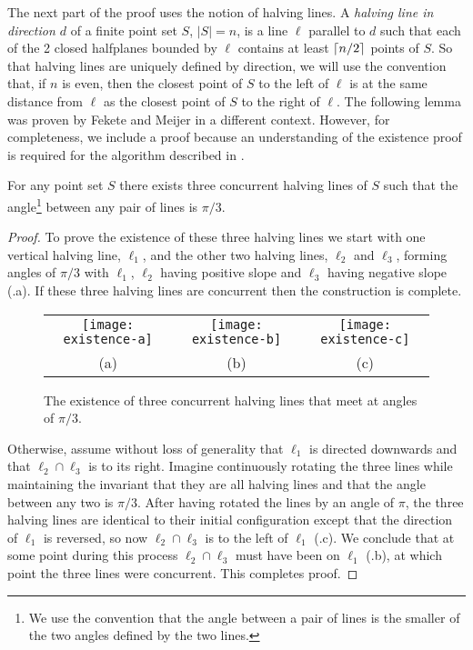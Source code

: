 \documentclass[lotsofwhite]{patmorin}
\begin{document}
The next part of the proof uses the notion of halving lines.  A
\emph{halving line in direction $d$} of a finite point set $S$,
$|S|=n$, is a line $\ell$ parallel to $d$ such that each of the 2
closed halfplanes bounded by $\ell$ contains at least
$\left\lceil n/2 \right\rceil$ points of $S$.  So that halving lines are uniquely
defined by direction, we will use the convention that, if $n$ is even,
then the closest point of $S$ to the left of $\ell$ is at the same
distance from $\ell$ as the closest point of $S$ to the right of
$\ell$.  The following lemma was proven by Fekete and Meijer
\cite[Lemma~2]{fm00} in a different context.  However, for
completeness, we include a proof because an understanding of the
existence proof is required for the algorithm described in
.

\begin{lem}
For any point set $S$ there exists three concurrent halving lines 
of $S$ such that the angle\footnote{We use the convention that
the angle between a pair of lines is the smaller of the two angles
defined by the two lines.} between any pair of lines is $\pi/3$.
\end{lem}

\begin{proof}
To prove the existence of these three halving lines we start with one
vertical halving line, $\ell_1$, and the other two halving lines,
$\ell_2$ and $\ell_3$, forming angles of $\pi/3$ with $\ell_1$,
$\ell_2$ having positive slope and $\ell_3$ having negative slope
(.a).  If these three halving lines are concurrent
then the construction is complete. 

\begin{figure}
\begin{center}\begin{tabular}{ccc}
\texttt{[image: existence-a]} &
\texttt{[image: existence-b]} &
\texttt{[image: existence-c]} \\
(a) & (b) & (c)
\end{tabular}\end{center}
\caption{The existence of three concurrent halving lines that meet at angles of
$\pi/3$.}
\end{figure}
Otherwise, assume without loss of generality that $\ell_1$ is directed downwards and that
$\ell_2\cap \ell_3$ is to its right.  Imagine continuously rotating
the three lines while maintaining the invariant that they are all
halving lines and that the angle between any two is $\pi/3$.  After
having rotated the lines by an angle of $\pi$, the three halving lines
are identical to their initial configuration except that the direction
of $\ell_1$ is reversed, so now $\ell_2\cap\ell_3$ is to the left of
$\ell_1$ (.c).  We conclude that at some point
during this process $\ell_2\cap\ell_3$ must have been on $\ell_1$
(.b), at which point the three lines were
concurrent.  This completes proof.  
\end{proof}
\end{document}
